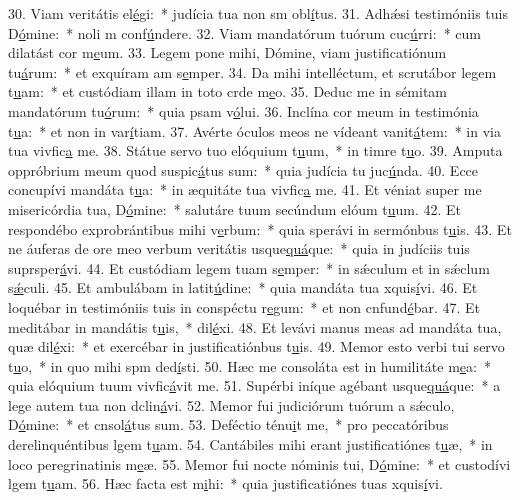 30. Viam veritátis el\uline{é}gi:~* judícia tua non sm obl\uline{í}tus.
31. Adhǽsi testimóniis tuis D\uline{ó}mine:~* noli m conf\uline{ú}ndere.
32. Viam mandatórum tuórum cuc\uline{ú}rri:~* cum dilatást cor m\uline{e}um.
33. Legem pone mihi, Dómine, viam justificatiónum tu\uline{á}rum:~* et exquíram am s\uline{e}mper.
34. Da mihi intelléctum, et scrutábor legem t\uline{u}am:~* et custódiam illam in toto crde m\uline{e}o.
35. Deduc me in sémitam mandatórum tu\uline{ó}rum:~* quia psam v\uline{ó}lui.
36. Inclína cor meum in testimónia t\uline{u}a:~* et non in var\uline{í}tiam.
37. Avérte óculos meos ne vídeant vanit\uline{á}tem:~* in via tua vivfic\uline{a} me.
38. Státue servo tuo elóquium t\uline{u}um,~* in timre t\uline{u}o.
39. Amputa oppróbrium meum quod suspic\uline{á}tus sum:~* quia judícia tu juc\uline{ú}nda.
40. Ecce concupívi mandáta t\uline{u}a:~* in æquitáte tua vivfic\uline{a} me.
41. Et véniat super me misericórdia tua, D\uline{ó}mine:~* salutáre tuum secúndum elóum t\uline{u}um.
42. Et respondébo exprobrántibus mihi v\uline{e}rbum:~* quia sperávi in sermónbus t\uline{u}is.
43. Et ne áuferas de ore meo verbum veritátis usque\uline{quá}que:~* quia in judíciis tuis suprsper\uline{á}vi.
44. Et custódiam legem tuam s\uline{e}mper:~* in sǽculum et in sǽclum s\uline{ǽ}culi.
45. Et ambulábam in latit\uline{ú}dine:~* quia mandáta tua xquis\uline{í}vi.
46. Et loquébar in testimóniis tuis in conspéctu r\uline{e}gum:~* et non cnfund\uline{é}bar.
47. Et meditábar in mandátis t\uline{u}is,~*  dil\uline{é}xi.
48. Et levávi manus meas ad mandáta tua, quæ dil\uline{é}xi:~* et exercébar in justificatiónbus t\uline{u}is.
49. Memor esto verbi tui servo t\uline{u}o,~* in quo mihi spm ded\uline{í}sti.
50. Hæc me consoláta est in humilitáte m\uline{e}a:~* quia elóquium tuum vivfic\uline{á}vit me.
51. Supérbi iníque agébant usque\uline{quá}que:~* a lege autem tua non dclin\uline{á}vi.
52. Memor fui judiciórum tuórum a sǽculo, D\uline{ó}mine:~* et cnsol\uline{á}tus sum.
53. Deféctio ténu\uline{i}t me,~* pro peccatóribus derelinquéntibus lgem t\uline{u}am.
54. Cantábiles mihi erant justificatiónes t\uline{u}æ,~* in loco peregrinatinis m\uline{e}æ.
55. Memor fui nocte nóminis tui, D\uline{ó}mine:~* et custodívi lgem t\uline{u}am.
56. Hæc facta est m\uline{i}hi:~* quia justificatiónes tuas xquis\uline{í}vi.
